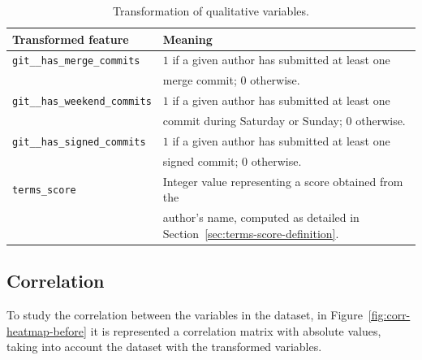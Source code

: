 \documentclass[a4paper, 12pt]{book}
\begin{document}
\begin{table}[htb]  %
 \renewcommand{\arraystretch}{1.2}  %
 \begin{center}
  \begin{tabular}{ l l }
    \toprule    %
    \textbf{Transformed feature} & \textbf{Meaning} \\
    \midrule
    \texttt{git\_\_has\_merge\_commits}   & $1$ if a given author has submitted at least one\\
                                          & merge commit; $0$ otherwise.\\
    \addlinespace
    \texttt{git\_\_has\_weekend\_commits} & $1$ if a given author has submitted at least one\\                                          & commit during Saturday or Sunday; $0$ otherwise.\\
    \addlinespace
    \texttt{git\_\_has\_signed\_commits}  & $1$ if a given author has submitted at least one\\
                                          & signed commit; $0$ otherwise.\\
    \addlinespace
    \texttt{terms\_score} & Integer value representing a score obtained from the\\
                          & author's name, computed as detailed in Section~\ref{sec:terms-score-definition}.\\
    \bottomrule     %
  \end{tabular}
  \caption{Transformation of qualitative variables.}
  \label{table:transformation-qualitative}
 \end{center}
\end{table}


\subsection{Correlation}
\label{ssec:correlation}

To study the correlation between the variables in the dataset, in Figure~\ref{fig:corr-heatmap-before} it is represented a correlation matrix with absolute values, taking into account the dataset with the transformed variables. 
\end{document}
